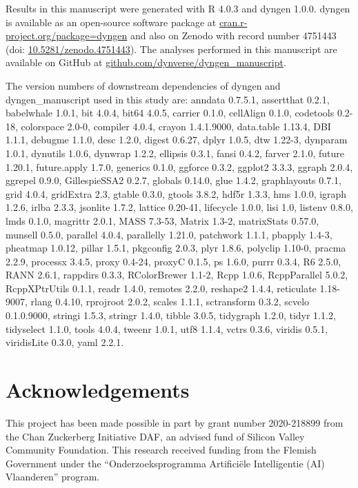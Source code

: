 \documentclass[10pt, a4paper]{article}
\begin{document}
Results in this manuscript were generated with R 4.0.3 and dyngen 1.0.0.
dyngen is available as an open-source software package at
\href{https://cran.r-project.org/package=dyngen}{cran.r-project.org/package=dyngen}
and also on Zenodo with record number 4751443 (doi:
\href{https://doi.org/10.5281/zenodo.4751443}{10.5281/zenodo.4751443}).
The analyses performed in this manuscript are available on GitHub at
\href{https://github.com/dynverse/dyngen_manuscript}{github.com/dynverse/dyngen\_manuscript}.

The version numbers of downstream dependencies of dyngen and
dyngen\_manuscript used in this study are: anndata 0.7.5.1, assertthat
0.2.1, babelwhale 1.0.1, bit 4.0.4, bit64 4.0.5, carrier 0.1.0,
cellAlign 0.1.0, codetools 0.2-18, colorspace 2.0-0, compiler 4.0.4,
crayon 1.4.1.9000, data.table 1.13.4, DBI 1.1.1, debugme 1.1.0, desc
1.2.0, digest 0.6.27, dplyr 1.0.5, dtw 1.22-3, dynparam 1.0.1, dynutils
1.0.6, dynwrap 1.2.2, ellipsis 0.3.1, fansi 0.4.2, farver 2.1.0, future
1.20.1, future.apply 1.7.0, generics 0.1.0, ggforce 0.3.2, ggplot2
3.3.3, ggraph 2.0.4, ggrepel 0.9.0, GillespieSSA2 0.2.7, globals 0.14.0,
glue 1.4.2, graphlayouts 0.7.1, grid 4.0.4, gridExtra 2.3, gtable 0.3.0,
gtools 3.8.2, hdf5r 1.3.3, hms 1.0.0, igraph 1.2.6, irlba 2.3.3,
jsonlite 1.7.2, lattice 0.20-41, lifecycle 1.0.0, lisi 1.0, listenv
0.8.0, lmds 0.1.0, magrittr 2.0.1, MASS 7.3-53, Matrix 1.3-2,
matrixStats 0.57.0, munsell 0.5.0, parallel 4.0.4, parallelly 1.21.0,
patchwork 1.1.1, pbapply 1.4-3, pheatmap 1.0.12, pillar 1.5.1, pkgconfig
2.0.3, plyr 1.8.6, polyclip 1.10-0, pracma 2.2.9, processx 3.4.5, proxy
0.4-24, proxyC 0.1.5, ps 1.6.0, purrr 0.3.4, R6 2.5.0, RANN 2.6.1,
rappdirs 0.3.3, RColorBrewer 1.1-2, Rcpp 1.0.6, RcppParallel 5.0.2,
RcppXPtrUtils 0.1.1, readr 1.4.0, remotes 2.2.0, reshape2 1.4.4,
reticulate 1.18-9007, rlang 0.4.10, rprojroot 2.0.2, scales 1.1.1,
sctransform 0.3.2, scvelo 0.1.0.9000, stringi 1.5.3, stringr 1.4.0,
tibble 3.0.5, tidygraph 1.2.0, tidyr 1.1.2, tidyselect 1.1.0, tools
4.0.4, tweenr 1.0.1, utf8 1.1.4, vctrs 0.3.6, viridis 0.5.1, viridisLite
0.3.0, yaml 2.2.1.

\hypertarget{acknowledgements}{%
	\section{Acknowledgements}\label{acknowledgements}}

This project has been made possible in part by grant number 2020-218899
from the Chan Zuckerberg Initiative DAF, an advised fund of Silicon
Valley Community Foundation. This research received funding from the
Flemish Government under the ``Onderzoeksprogramma Artificiële
Intelligentie (AI) Vlaanderen'' program.
\end{document}
